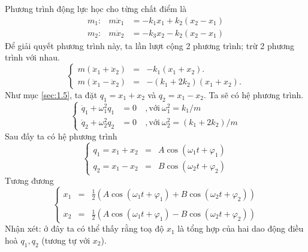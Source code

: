\documentclass[12pt]{article}
\begin{document}
Phương trình động lực học cho từng chất điểm là
\begin{equation*}
    \begin{array}{ccc}
        m_1: & m \ddot{x}_1 &= - k_1 x_1 + k_2 (x_2 - x_1) \\
        m_2: & m \ddot{x}_2 &= - k_3 x_2 - k_2 (x_2 - x_1)
    \end{array}
\end{equation*}
Để giải quyết phương trình này, ta lần lượt cộng 2 phương trình; trừ 2 phương trình với nhau.
\begin{equation}
    \left\{
    \begin{array}{ccc}
    m ( \ddot{x}_1 + \ddot{x}_2) &=& - k_1 (x_1 + x_2).   \\
    m ( \ddot{x}_1 - \ddot{x}_2) &=& - (k_1 +2 k_2) (x_1 +x_2).
    \end{array}
    \right.
    \label{eq:2.1}
\end{equation}
Như mục \ref{sec:1.5}, ta đặt \(q_1 = x_1 + x_2\) và \(q_2 = x_1 - x_2\). Ta sẽ có hệ phương trình.
\begin{equation}
    \left\{
    \begin{array}{ccl}
    \ddot{q}_1 + \omega_1^2 q_1 &= 0 & \ , \text{với} \ \omega_1^2 = k_1/m \\
    \ddot{q}_2 + \omega_2^2 q_2 &= 0 & \ , \text{với} \ \omega_2^2 = (k_1+2k_2)/m
    \end{array}
    \right.
    \label{eq:2.2}
\end{equation}
Sau đấy ta có hệ phương trình
\begin{equation}
    \left\{ 
    \begin{array}{ccc}
    q_1 = x_1 + x_2 &=& A \cos{\left( \omega_1 t + \varphi_1\right)} \\
    q_2 = x_1 - x_2 &=& B \cos{\left( \omega_2 t + \varphi_2 \right)}
    \end{array}
    \right.
    \label{eq:2.3}
\end{equation}
Tương đương
\begin{equation}
    \left\{ 
    \begin{array}{ccc}
    x_1 &=& \frac12 \left(A \cos{\left( \omega_1 t + \varphi_1\right)} + B \cos{\left( \omega_2 t + \varphi_2 \right)} \right) \\
    \\
    x_2 &=& \frac12 \left(A \cos{\left( \omega_1 t + \varphi_1\right)} - B \cos{\left( \omega_2 t + \varphi_2 \right)} \right)
    \end{array}
    \right.
\end{equation}
Nhận xét: ở đây ta có thể thấy rằng toạ độ \(x_1\) là tổng hợp của hai dao động điều hoà \(q_1, q_2\) (tương tự với \(x_2\)). 
\end{document}
